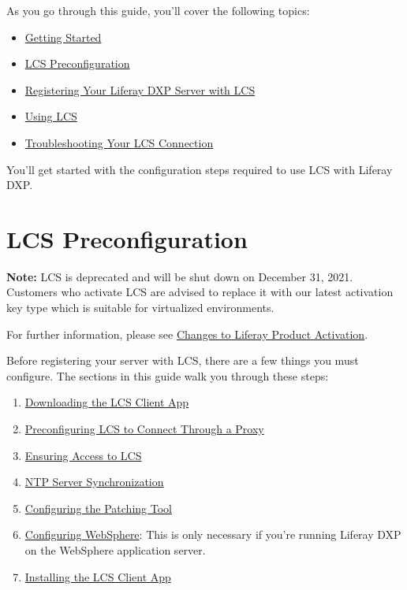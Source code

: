 As you go through this guide, you'll cover the following topics:

\begin{itemize}
\tightlist
\item
  \href{/docs/7-0/deploy/-/knowledge_base/d/getting-started-with-lcs}{Getting
  Started}
\item
  \href{/docs/7-0/deploy/-/knowledge_base/d/lcs-preconfiguration}{LCS
  Preconfiguration}
\item
  \href{/docs/7-0/deploy/-/knowledge_base/d/registering-your-dxp-server-with-lcs}{Registering
  Your Liferay DXP Server with LCS}
\item
  \href{/docs/7-0/deploy/-/knowledge_base/d/using-lcs}{Using LCS}
\item
  \href{/docs/7-0/deploy/-/knowledge_base/d/troubleshooting-your-lcs-connection}{Troubleshooting
  Your LCS Connection}
\end{itemize}

You'll get started with the configuration steps required to use LCS with
Liferay DXP.

\section{LCS Preconfiguration}\label{lcs-preconfiguration}

\noindent\hrulefill

\textbf{Note:} LCS is deprecated and will be shut down on December 31,
2021. Customers who activate LCS are advised to replace it with our
latest activation key type which is suitable for virtualized
environments.

For further information, please see
\href{https://help.liferay.com/hc/en-us/articles/4402347960845-Changes-to-Liferay-Product-Activation}{Changes
to Liferay Product Activation}.

\noindent\hrulefill

Before registering your server with LCS, there are a few things you must
configure. The sections in this guide walk you through these steps:

\begin{enumerate}
\def\labelenumi{\arabic{enumi}.}
\tightlist
\item
  \hyperref[downloading-the-lcs-client-app]{Downloading the LCS Client
  App}
\item
  \hyperref[preconfiguring-lcs-to-connect-through-a-proxy]{Preconfiguring
  LCS to Connect Through a Proxy}
\item
  \hyperref[ensuring-access-to-lcs]{Ensuring Access to LCS}
\item
  \hyperref[ntp-server-synchronization]{NTP Server Synchronization}
\item
  \hyperref[configuring-the-patching-tool]{Configuring the Patching
  Tool}
\item
  \hyperref[configuring-websphere]{Configuring WebSphere}: This is only
  necessary if you're running Liferay DXP on the WebSphere application
  server.
\item
  \hyperref[installing-the-lcs-client-app]{Installing the LCS Client
  App}
\end{enumerate}

